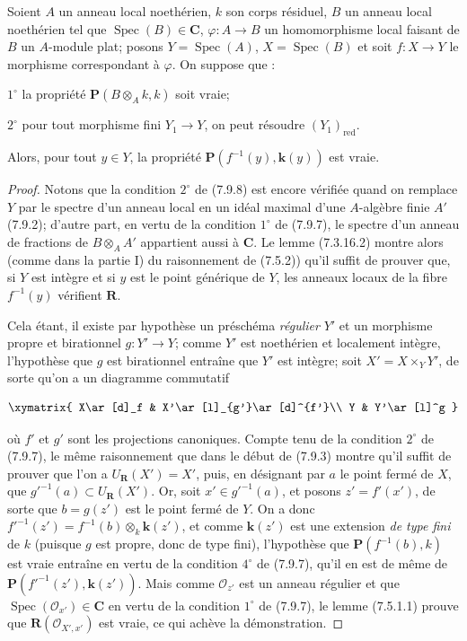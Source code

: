 \begin{proposition}[7.9.8]
\label{IV.2.s7.9.8-fr}
Soient $A$ un anneau local noethérien, $k$ son corps résiduel, $B$ un anneau
local noethérien tel que $\operatorname{Spec}(B)\in\boldsymbol{C}$,
$\varphi:A\to B$ un homomorphisme local faisant de $B$ un $A$-module plat;
posons $Y=\operatorname{Spec}(A)$, $X=\operatorname{Spec}(B)$ et soit
$f:X\to Y$ le morphisme correspondant à $\varphi$. On suppose que :

$1^\circ$ la propriété $\boldsymbol P(B\otimes_A k,k)$ soit vraie;

$2^\circ$ pour tout morphisme fini $Y_1\to Y$, on peut résoudre
$(Y_1)_{\mathrm{red}}$.

Alors, pour tout $y\in Y$, la propriété
$\boldsymbol P(f^{-1}(y),\boldsymbol{k}(y))$ est vraie.
\end{proposition}

\begin{proof}
Notons que la condition $2^\circ$ de (7.9.8) est encore vérifiée quand on
remplace $Y$ par le spectre d'un anneau local en un idéal maximal d'une
$A$-algèbre finie $A'$ (7.9.2); d'autre part, en vertu de la condition
$1^\circ$ de (7.9.7), le spectre d'un anneau de fractions de
$B\otimes_AA'$ appartient aussi à $\boldsymbol{C}$. Le lemme (7.3.16.2) montre
alors (comme dans la partie I) du raisonnement de (7.5.2)) qu'il suffit de
prouver que, si $Y$ est intègre et si $y$ est le point générique de $Y$, les
anneaux locaux de la fibre $f^{-1}(y)$ vérifient $\boldsymbol R$.

Cela étant, il existe par hypothèse un préschéma \emph{régulier} $Y'$ et un morphisme
propre et birationnel $g:Y'\to Y$; comme $Y'$ est noethérien et localement
intègre, l'hypothèse que $g$ est birationnel entraîne que $Y'$ est intègre;
soit $X'=X\times_YY'$, de sorte qu'on a un diagramme commutatif

\begin{env}[7.9.8.1]
\label{IV.2.s7.9.8.1-fr}
\[
\xymatrix{
X\ar[d]_f & X'\ar[l]_{g'}\ar[d]^{f'}\\
Y & Y'\ar[l]^g
}
\]
\end{env}

où $f'$ et $g'$ sont les projections canoniques. Compte tenu de la condition
$2^\circ$ de (7.9.7), le même raisonnement que dans le début de (7.9.3) montre
qu'il suffit de prouver
que l'on a $U_{\mathbf{R}}(X')=X'$, puis, en désignant par $a$ le point
fermé de $X$, que $g'^{-1}(a)\subset U_{\mathbf{R}}(X')$. Or, soit
$x'\in g'^{-1}(a)$, et posons $z'=f'(x')$, de sorte que $b=g(z')$ est le
point fermé de $Y$. On a donc $f'^{-1}(z')=f^{-1}(b)\otimes_k \boldsymbol{k}(z')$,
et comme $\boldsymbol{k}(z')$ est une extension \emph{de type fini} de $k$ (puisque $g$ est
propre, donc de type fini), l'hypothèse que $\boldsymbol P(f^{-1}(b),k)$ est
vraie entraîne en vertu de la condition $4^\circ$ de (7.9.7), qu'il en est de
même de $\boldsymbol P(f'^{-1}(z'),\boldsymbol{k}(z'))$. Mais comme
$\mathcal O_{z'}$ est un anneau régulier et que
$\operatorname{Spec}(\mathcal O_{x'})\in\boldsymbol{C}$ en vertu de la
condition $1^\circ$ de (7.9.7), le lemme (7.5.1.1) prouve que
$\boldsymbol R(\mathcal O_{X',x'})$ est vraie, ce qui achève la démonstration.
\end{proof}

